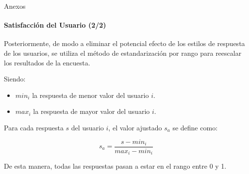 \begin{frame}[noframenumbering]{Anexos}
\framesubtitle{Satisfacci\'on del Usuario (2/2)}
Posteriormente, de modo a eliminar el potencial efecto de los estilos de respuesta
de los usuarios, se utiliza el m\'etodo de estandarizaci\'on 
por rango para reescalar los resultados de la encuesta.

Siendo:
\begin{itemize}
	\item $min_i$ la respuesta de menor valor del usuario $i$.
	\item $max_i$ la respuesta de mayor valor del usuario $i$.
\end{itemize}

Para cada respuesta $s$ del usuario $i$, el valor ajustado $s_a$ se define como:

\begin{equation*}
s_a=\frac{s-min_i}{max_i-min_i}
\end{equation*}


De esta manera, todas las respuestas pasan a estar en el rango entre 0 y 1.  
\end{frame}